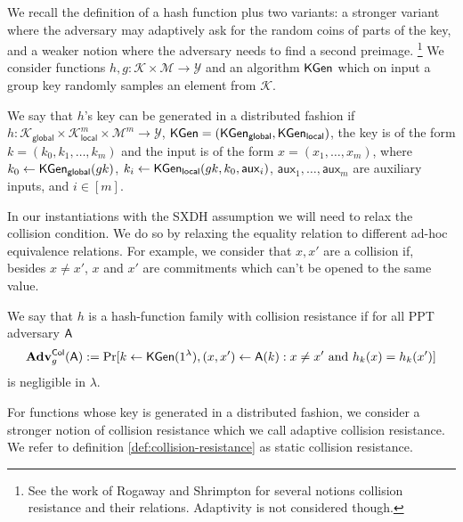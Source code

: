 
We recall the definition of a hash function plus two variants: a stronger variant where  the adversary may adaptively ask for the random coins of parts of the key, and a weaker notion where the adversary needs to find a second preimage. \footnote{See the work of Rogaway and Shrimpton \cite{FSE:RogShr04} for several notions collision resistance and their relations. Adaptivity is not considered though.} We consider functions $h,g:\mathcal{K}\times\mathcal{M}\to\mathcal{Y}$ and an algorithm $\mathsf{KGen}$ which on input a group key randomly samples an element from $\mathcal{K}$.

We say that $h$'s key can be generated in a distributed fashion if $h:\mathcal{K}_\mathsf{global}\times\mathcal{K}^m_{\mathsf{local}}\times\mathcal{M}^m\to \mathcal{Y}$, $\mathsf{KGen} = (\mathsf{KGen}_\mathsf{global},\mathsf{KGen}_\mathsf{local})$, the key is of the form $k = (k_0,k_1,\ldots,k_m)$ and the input is of the form $x=(x_1,\ldots,x_m)$, where $k_0\gets\mathsf{KGen}_{\mathsf{global}}(gk)$, $k_i\gets\mathsf{KGen}_{\mathsf{local}}(gk,k_0,\mathsf{aux}_i)$, $\mathsf{aux}_1,\ldots,\mathsf{aux}_m$ are auxiliary inputs, and $i\in[m]$. 

In our instantiations with the SXDH assumption we will need to relax the collision condition. We do so by relaxing the equality relation to different ad-hoc equivalence relations. For example, we consider that $x,x'$ are a collision if, besides $x\neq x'$, $x$ and $x'$ are commitments which can't be opened to the same value.

\begin{definition}\label{def:hash1}
 We say that $h$ is a hash-function family with collision resistance if for all PPT adversary $\mathsf{A}$
$$
\mathbf{Adv}_g^{\mathsf{Col}}(\mathsf{A}) := \Pr[k\gets\mathsf{KGen}(1^\lambda), (x,x')\gets \mathsf{A}(k):x\neq x'\text{ and }h_k(x)=h_k(x')]
$$ 
is negligible in $\lambda$.
\label{def:collision-resistance}
\end{definition}

For functions whose key is generated in a distributed fashion, we consider a stronger notion of collision resistance which we call adaptive collision resistance. We refer to definition \ref{def:collision-resistance} as static collision resistance.


